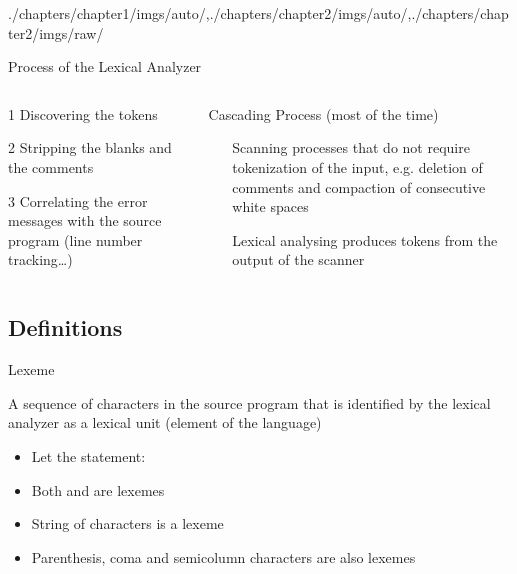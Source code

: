 \begin{graphicspathcontext}{{./chapters/chapter1/imgs/auto/},{./chapters/chapter2/imgs/auto/},{./chapters/chapter2/imgs/raw/}}
\begin{bibunit}[apalike]
\begin{frame}{{Process of the} Lexical Analyzer}
	\begin{columns}
		\begin{column}{.5\linewidth}
			\begin{rightanchorblock}{}{1}
				Discovering the tokens
			\end{rightanchorblock}
			\begin{rightanchorblock}{}{2}
				Stripping the blanks and the comments
			\end{rightanchorblock}
			\begin{rightanchorblock}{}{3}
				Correlating the error messages with the source program (line number tracking\dots)
			\end{rightanchorblock}
		\end{column}
		\begin{column}{.5\linewidth}
			\begin{block}{Cascading Process (most of the time)}
				\begin{enumerate}
					\item[Scanning] processes that do not require tokenization of the input, e.g. deletion of comments and compaction of consecutive white spaces
					\item[Lexical analysing] produces tokens from the output of the scanner
				\end{enumerate}
			\end{block}
		\end{column}
	\end{columns}
\end{frame}

\subsection{Definitions}
\subsectiontableofcontentslide

\begin{frame}{Lexeme}
	\begin{definition}
		A sequence of characters in the source program that is identified by the lexical analyzer as a lexical unit (element of the language)
	\end{definition}
	\vspace{1cm}
	\begin{example}
		\begin{itemize}
		\item Let the statement: 
		\item Both  and  are lexemes
		\item String of characters is a lexeme
		\item Parenthesis, coma and semicolumn characters are also lexemes
		\end{itemize}
	\end{example}
\end{frame}


\end{bibunit}
\end{graphicspathcontext}

